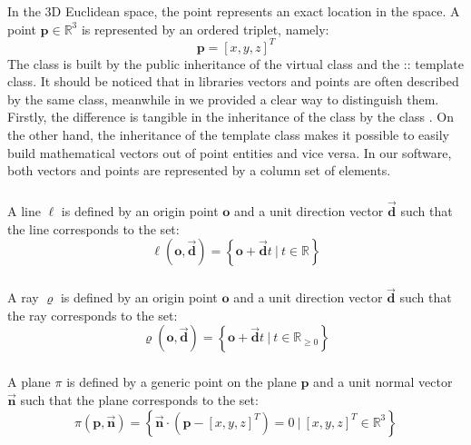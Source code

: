 \subsubsection{\Point{}}
In the 3D Euclidean space, the point represents an exact location in the space. A point $\boldsymbol{p} \in \mathbb{R}^3$ is represented by an ordered triplet, namely:
%
\begin{equation*}
\boldsymbol{p} = \left[x, y, z\right]^T
\end{equation*}
%
The \Point{} class is built by the public inheritance of the virtual class \Entity{} and the \Eigen{}::\MatrixBase{} template class. It should be noticed that in \cpp{} libraries vectors and points are often described by the same class, meanwhile in \Acme{} we provided a clear way to distinguish them. Firstly, the difference is tangible in the inheritance of the \Entity{} class by the class \Point{}. On the other hand, the inheritance of the \MatrixBase{} template class makes it possible to easily build mathematical vectors out of point entities and vice versa. In our software, both vectors and points are represented by a column set of elements.

\subsubsection{\Line{}}
A line $\ell$ is defined by an origin point $\boldsymbol{o}$ and a unit direction vector $\vec{\boldsymbol{d}}$ such that the line corresponds to the set:
%
\begin{equation*}
  \ell ( \boldsymbol{o}, \vec{\boldsymbol{d}} ) = \left\{ \boldsymbol{o} + \vec{\boldsymbol{d}} t ~ \big| ~ t \in \mathbb{R} \right\}
\end{equation*}

\subsubsection{\Ray{}}
A ray $\varrho$ is defined by an origin point $\boldsymbol{o}$ and a unit direction vector $\vec{\boldsymbol{d}}$ such that the ray corresponds to the set:
%
\begin{equation*}
  \varrho ( \boldsymbol{o}, \vec{\boldsymbol{d}} ) = \left\{ \boldsymbol{o} + \vec{\boldsymbol{d}} t ~ \big| ~ t \in \mathbb{R}_{\ge0} \right\}
\end{equation*}

\subsubsection{\Plane{}}
A plane $\pi$ is defined by a generic point on the plane $\boldsymbol{p}$ and a unit normal vector $\vec{\boldsymbol{n}}$ such that the plane corresponds to the set:
%
\begin{equation*}
  \pi ( \boldsymbol{p}, \vec{\boldsymbol{n}} ) = \left\{ \vec{\boldsymbol{n}} \cdot \left(\boldsymbol{p} - \left[x, y, z\right]^T \right) = 0 ~ \big| ~ \left[x, y, z\right]^T \in \mathbb{R}^3 \right\}
\end{equation*}

